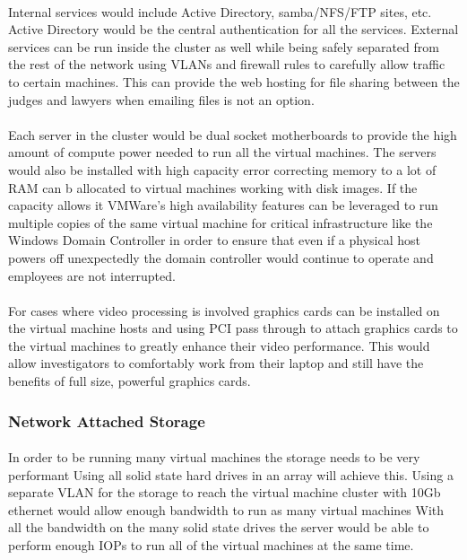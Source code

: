 \documentclass{article}
\begin{document}
\paragraph{}
Internal services would include Active Directory, samba/NFS/FTP sites, etc.
Active Directory would be the central authentication for all the services.
External services can be run inside the cluster as well while being safely separated from the rest of the network using VLANs and firewall rules to carefully allow traffic to certain machines.
This can provide the web hosting for file sharing between the judges and lawyers when emailing files is not an option.
\paragraph{}
Each server in the cluster would be dual socket motherboards to provide the high amount of compute power needed to run all the virtual machines.
The servers would also be installed with high capacity error correcting memory to a lot of RAM can b allocated to virtual machines working with disk images.
If the capacity allows it VMWare's high availability features can be leveraged to run multiple copies of the same virtual machine for critical infrastructure like the Windows Domain Controller in order to ensure that even if a physical host powers off unexpectedly the domain controller would continue to operate and employees are not interrupted.
\paragraph{}
For cases where video processing is involved graphics cards can be installed on the virtual machine hosts and using PCI pass through to attach graphics cards to the virtual machines to greatly enhance their video performance.
This would allow investigators to comfortably work from their laptop and still have the benefits of full size, powerful graphics cards.

\subsubsection{Network Attached Storage}
\paragraph{} 
In order to be running many virtual machines the storage needs to be very performant Using all solid state hard drives in an array will achieve this.
Using a separate VLAN for the storage to reach the virtual machine cluster with 10Gb ethernet would allow enough bandwidth to run as many virtual machines 
With all the bandwidth on the many solid state drives the server would be able to perform enough IOPs to run all of the virtual machines at the same time.
\end{document}
